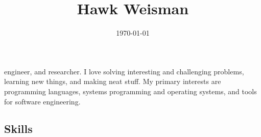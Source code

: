 \documentclass[a4paper]{tufte-handout}
\title{Hawk Weisman}
\date{}
\begin{document}
\date{\today}
\maketitle


\noindent
{} engineer, and researcher. I love solving interesting and challenging problems, learning new things, and making neat stuff. My primary interests are programming languages, systems programming and operating systems, and tools for software engineering.

\subsection{Skills}
\end{document}
